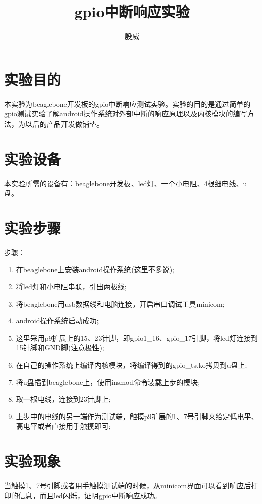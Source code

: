 \documentclass[a4paper,10.5pt]{article}
\begin{document}
    \title{gpio中断响应实验}
    \author{殷\hspace{2em}威}
    \maketitle

    \section{实验目的}
    本实验为beaglebone开发板的gpio中断响应测试实验。实验的目的是通过简单的gpio测试实验了解android操作系统对外部中断的响应原理以及内核模块的编写方法，为以后的产品开发做铺垫。
    \section{实验设备}
    本实验所需的设备有：beaglebone开发板、led灯、一个小电阻、4根细电线、u盘。

    \section{实验步骤}
    \noindent 步骤：
    \begin{enumerate}
        \item 在beaglebone上安装android操作系统(这里不多说);
        \item 将led灯和小电阻串联，引出两极线;
        \item 将beaglebone用usb数据线和电脑连接，开启串口调试工具minicom;
        \item android操作系统启动成功;
        \item 这里采用p9扩展上的15、23针脚，即gpio1\_16、gpio\_17引脚，将led灯连接到15针脚和GND脚(注意极性);
        \item 在自己的操作系统上编译内核模块，将编译得到的gpio\_ts.ko拷贝到u盘上;
        \item 将u盘插到beaglebone上，使用insmod命令装载上步的模块;
        \item 取一根电线，连接到23针脚上;
        \item 上步中的电线的另一端作为测试端，触摸p9扩展的1、7号引脚来给定低电平、高电平或者直接用手触摸即可;
    \end{enumerate}
    \section{实验现象}
    当触摸1、7号引脚或者用手触摸测试端的时候，从minicom界面可以看到响应后打印的信息，而且led闪烁，证明gpio中断响应成功。
\end{document}
